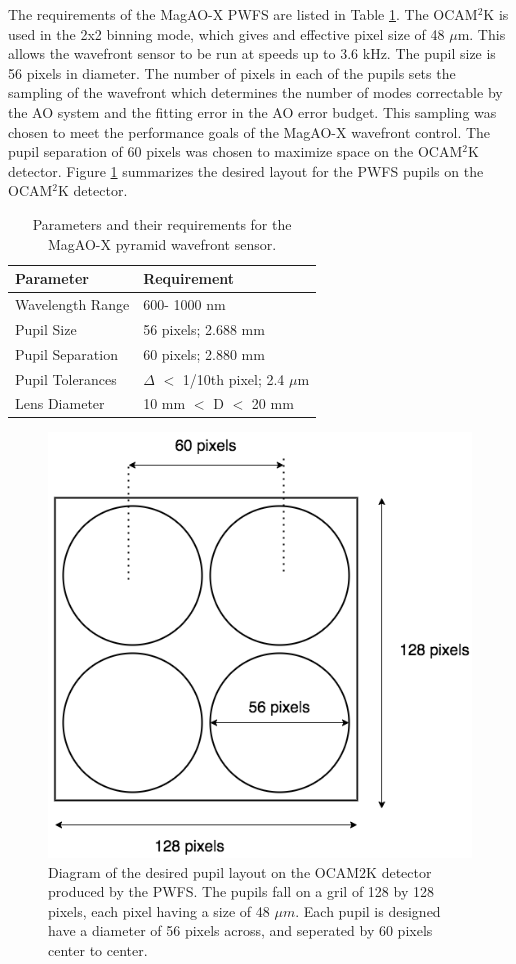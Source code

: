  The requirements of the MagAO-X PWFS are listed in Table \ref{tab:requirements}. The OCAM$^2$K is used in the 2x2 binning mode, which gives and effective pixel size of 48 $\mu$m. This allows the wavefront sensor to be run at speeds up to 3.6 kHz. The pupil size is 56 pixels in diameter. The number of pixels in each of the pupils sets the sampling of the wavefront which determines the number of modes correctable by the AO system and the fitting error in the AO error budget. This sampling was chosen to meet the performance goals of the MagAO-X wavefront control. The pupil separation of 60 pixels was chosen to maximize space on the OCAM$^2$K detector. Figure \ref{fig:PWFSpupils} summarizes the desired layout for the PWFS pupils on the OCAM$^2$K detector. 
	
\begin{table}
	\begin{center}
		\begin{tabular}{ | l| l | }
			\hline
			\textbf{Parameter}& \textbf{Requirement} \\ \hline
			Wavelength Range &600- 1000 nm \\ \hline
			Pupil Size & 56 pixels; 2.688 mm \\ \hline
			Pupil Separation & 60 pixels; 2.880 mm  \\ \hline
			Pupil Tolerances & $\Delta$ $<$ 1/10th pixel; 2.4 $\mu$m  \\ \hline
			Lens Diameter & 10 mm $<$ D  $<$ 20 mm \\ \hline
				
		\end{tabular}
	\end{center}
	\caption{Parameters and their requirements for the MagAO-X pyramid wavefront sensor.}
	\label{tab:requirements}
\end{table}

\begin{figure}
    \centering
    \includegraphics[width=.5\textwidth]{Chapter Materials/Chapter Three Materials/MagAOXpupils.png}
    \caption{Diagram of the desired pupil layout on the OCAM$2$K detector produced by the PWFS. The pupils fall on a gril of 128 by 128 pixels, each pixel having a size of 48 $\mu m$. Each pupil is designed have a diameter of 56 pixels across, and seperated by 60 pixels center to center.}
    \label{fig:PWFSpupils}
\end{figure}
    

